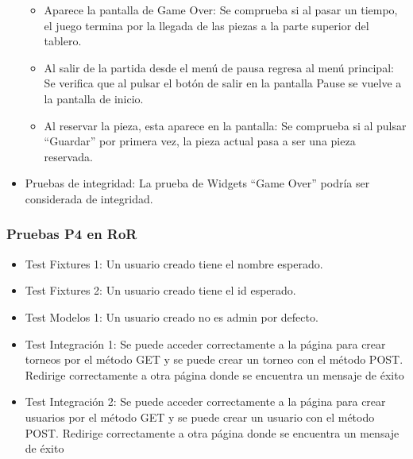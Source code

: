 \documentclass{article}
\begin{document}
\begin{itemize}
\begin{itemize}
    \item Aparece la pantalla de Game Over: Se comprueba si al pasar un tiempo, el juego termina por la llegada de las piezas a la parte superior del tablero.

    \item Al salir de la partida desde el menú de pausa regresa al menú principal: Se verifica que al pulsar el botón de salir en la pantalla Pause se vuelve a la pantalla de inicio.
    
    \item Al reservar la pieza, esta aparece en la pantalla: Se comprueba si al pulsar ``Guardar'' por primera vez, la pieza actual pasa a ser una pieza reservada.
  \end{itemize}
\item Pruebas de integridad: La prueba de Widgets ``Game Over'' podría ser considerada de integridad.

  \end{itemize}

\subsubsection{Pruebas P4 en RoR}

\begin{itemize}
    \item Test Fixtures 1: Un usuario creado tiene el nombre esperado.

    \item Test Fixtures 2: Un usuario creado tiene el id esperado.
    
    \item Test Modelos 1: Un usuario creado no es admin por defecto.

    \item Test Integración 1: Se puede acceder correctamente a la página para crear torneos por el método GET y se puede crear un torneo con el método POST. Redirige correctamente a otra página donde se encuentra un mensaje de éxito
    
    \item Test Integración 2: Se puede acceder correctamente a la página para crear usuarios por el método GET y se puede crear un usuario con el método POST. Redirige correctamente a otra página donde se encuentra un mensaje de éxito
\end{itemize}
\end{document}
